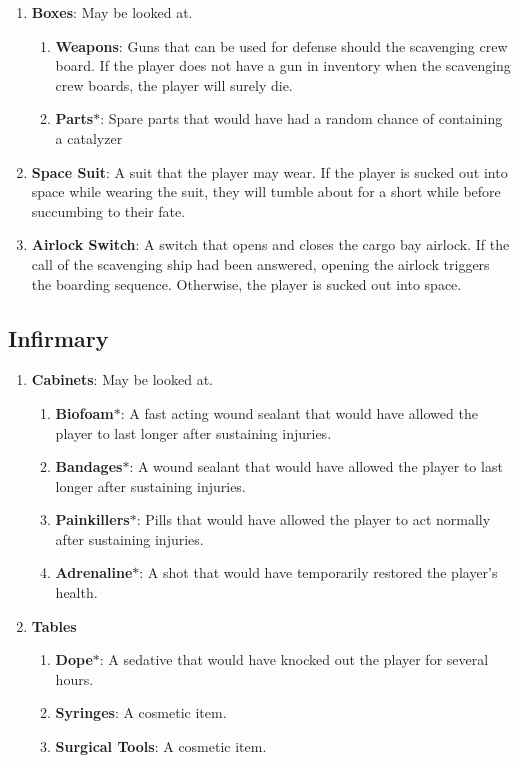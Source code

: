 \documentclass[12pt]{article}
\begin{document}
\begin{enumerate}
  \item \textbf{Boxes}: May be looked at.
  \begin{enumerate}
    \item \textbf{Weapons}: Guns that can be used for defense should the
    scavenging crew board. If the player does not have a gun in inventory when
    the scavenging crew boards, the player will surely die.
    \item \textbf{Parts}$\ast$: Spare parts that would have had a random chance
      of containing a catalyzer
  \end{enumerate}
  \item \textbf{Space Suit}: A suit that the player may wear. If the player is
    sucked out into space while wearing the suit, they will tumble about for a
    short while before succumbing to their fate.
  \item \textbf{Airlock Switch}: A switch that opens and closes the cargo bay
    airlock. If the call of the scavenging ship had been answered, opening the
    airlock triggers the boarding sequence. Otherwise, the player is sucked out
    into space.
\end{enumerate}



\subsection{Infirmary}

\begin{enumerate}
  \item \textbf{Cabinets}: May be looked at.
  \begin{enumerate}
    \item \textbf{Biofoam}$\ast$: A fast acting wound sealant that would have
      allowed the player to last longer after sustaining injuries.
    \item \textbf{Bandages}$\ast$: A wound sealant that would have allowed the
      player to last longer after sustaining injuries.
    \item \textbf{Painkillers}$\ast$: Pills that would have allowed the player
      to act normally after sustaining injuries.
    \item \textbf{Adrenaline}$\ast$: A shot that would have temporarily restored
      the player's health.
  \end{enumerate}
  \item \textbf{Tables}
  \begin{enumerate}
    \item \textbf{Dope}$\ast$: A sedative that would have knocked out the player
      for several hours.
    \item \textbf{Syringes}: A cosmetic item.
    \item \textbf{Surgical Tools}: A cosmetic item.
  \end{enumerate}
\end{enumerate}
\end{document}
